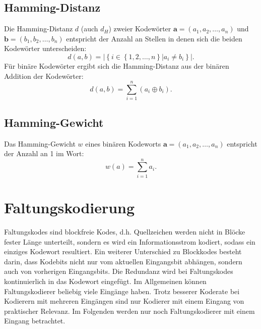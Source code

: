 \subsection{Hamming-Distanz}
\label{kapitel:grundlagen_hamming_distanz}
Die Hamming-Distanz $d$ (auch $d_{H}$) zweier Kodewörter $\mathbf{a}=\left( a_{1},a_{2},\dots ,a_{n}\right)$ und $\mathbf{b}=\left( b_{1},b_{2},\dots ,b_{n}\right)$ entspricht der Anzahl an Stellen in denen sich die beiden Kodewörter unterscheiden:
\begin{equation}
d(a,b)=\vert\left\lbrace i \in \left\lbrace 1,2,\dots ,n \right\rbrace\vert a_{i}\neq b_{i}\right\rbrace\vert.
\end{equation}
Für binäre Kodewörter ergibt sich die Hamming-Distanz aus der binären Addition der Kodewörter:
\begin{equation}
d(a,b)=\sum_{i=1}^{n} \left( a_{i} \oplus b_{i}\right).
\end{equation}

\subsection{Hamming-Gewicht}
\label{kapitel:grundlagen_hamming_gewicht}
Das Hamming-Gewicht $w$ eines binären Kodeworts $\mathbf{a}=\left( a_{1},a_{2},\dots ,a_{n}\right)$ entspricht der Anzahl an 1 im Wort:
\begin{equation}
w(a)=\sum_{i=1}^{n} a_{i}.
\end{equation}

\section{Faltungskodierung}
\label{kapitel:grundlagen_faltungskodierung}
Faltungskodes sind blockfreie Kodes, d.h. Quellzeichen werden nicht in Blöcke fester Länge unterteilt, sondern es wird ein Informationsstrom kodiert, sodass ein einziges Kodewort resultiert. Ein weiterer Unterschied zu Blockkodes besteht darin, dass Kodebits nicht nur vom aktuellen Eingangsbit abhängen, sondern auch von vorherigen Eingangsbits. Die Redundanz wird bei Faltungskodes kontinuierlich in das Kodewort eingefügt. Im Allgemeinen können Faltungskodierer beliebig viele Eingänge haben. Trotz besserer Koderate bei Kodierern mit mehreren Eingängen sind nur Kodierer mit einem Eingang von praktischer Relevanz. Im Folgenden werden nur noch Faltungskodierer mit einem Eingang betrachtet.

